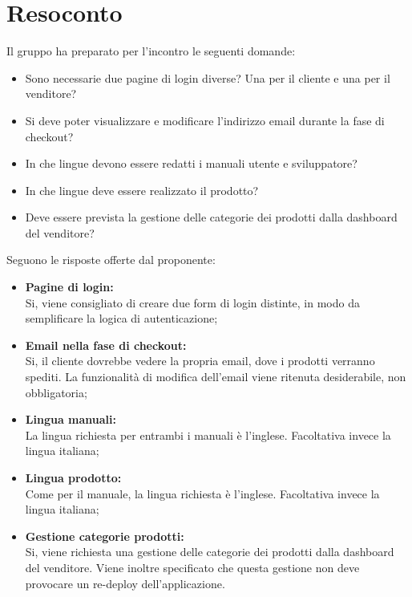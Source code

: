 \section{Resoconto}
Il gruppo ha preparato per l'incontro le seguenti domande:
\begin{itemize}
\item Sono necessarie due pagine di login diverse? Una per il cliente e una per il venditore?
\item Si deve poter visualizzare e modificare l'indirizzo email durante la fase di checkout?
\item In che lingue devono essere redatti i manuali utente e sviluppatore?
\item In che lingue deve essere realizzato il prodotto?
\item Deve essere prevista la gestione delle categorie dei prodotti dalla dashboard del venditore?

\end{itemize}
Seguono le risposte offerte dal proponente:
\begin{itemize}
\item \textbf{Pagine di login:}\\
Si, viene consigliato di creare due form di login distinte, in modo da semplificare la logica di autenticazione;
\item \textbf{Email nella fase di checkout:}\\
Si, il cliente dovrebbe vedere la propria email, dove i prodotti verranno spediti. La funzionalità di modifica dell'email viene ritenuta desiderabile, non obbligatoria; 
\item \textbf{Lingua manuali:}\\
La lingua richiesta per entrambi i manuali è l'inglese. Facoltativa invece la lingua italiana;
\item \textbf{Lingua prodotto:}\\
Come per il manuale, la lingua richiesta è l'inglese. Facoltativa invece la lingua italiana;
\item \textbf{Gestione categorie prodotti:}\\
Si, viene richiesta una gestione delle categorie dei prodotti dalla dashboard del venditore. Viene inoltre specificato che questa gestione non deve provocare un re-deploy dell'applicazione.
\end{itemize}


